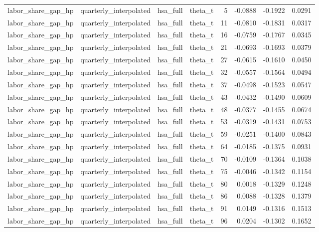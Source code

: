 \begin{tabular}{llllrrrr}
labor\_share\_gap\_hp & quarterly\_interpolated & hsa\_full & theta\_t & 5 & -0.0888 & -0.1922 & 0.0291 \\
labor\_share\_gap\_hp & quarterly\_interpolated & hsa\_full & theta\_t & 11 & -0.0810 & -0.1831 & 0.0317 \\
labor\_share\_gap\_hp & quarterly\_interpolated & hsa\_full & theta\_t & 16 & -0.0759 & -0.1767 & 0.0345 \\
labor\_share\_gap\_hp & quarterly\_interpolated & hsa\_full & theta\_t & 21 & -0.0693 & -0.1693 & 0.0379 \\
labor\_share\_gap\_hp & quarterly\_interpolated & hsa\_full & theta\_t & 27 & -0.0615 & -0.1610 & 0.0450 \\
labor\_share\_gap\_hp & quarterly\_interpolated & hsa\_full & theta\_t & 32 & -0.0557 & -0.1564 & 0.0494 \\
labor\_share\_gap\_hp & quarterly\_interpolated & hsa\_full & theta\_t & 37 & -0.0498 & -0.1523 & 0.0547 \\
labor\_share\_gap\_hp & quarterly\_interpolated & hsa\_full & theta\_t & 43 & -0.0432 & -0.1490 & 0.0609 \\
labor\_share\_gap\_hp & quarterly\_interpolated & hsa\_full & theta\_t & 48 & -0.0377 & -0.1455 & 0.0674 \\
labor\_share\_gap\_hp & quarterly\_interpolated & hsa\_full & theta\_t & 53 & -0.0319 & -0.1431 & 0.0753 \\
labor\_share\_gap\_hp & quarterly\_interpolated & hsa\_full & theta\_t & 59 & -0.0251 & -0.1400 & 0.0843 \\
labor\_share\_gap\_hp & quarterly\_interpolated & hsa\_full & theta\_t & 64 & -0.0185 & -0.1375 & 0.0931 \\
labor\_share\_gap\_hp & quarterly\_interpolated & hsa\_full & theta\_t & 70 & -0.0109 & -0.1364 & 0.1038 \\
labor\_share\_gap\_hp & quarterly\_interpolated & hsa\_full & theta\_t & 75 & -0.0046 & -0.1342 & 0.1154 \\
labor\_share\_gap\_hp & quarterly\_interpolated & hsa\_full & theta\_t & 80 & 0.0018 & -0.1329 & 0.1248 \\
labor\_share\_gap\_hp & quarterly\_interpolated & hsa\_full & theta\_t & 86 & 0.0088 & -0.1328 & 0.1379 \\
labor\_share\_gap\_hp & quarterly\_interpolated & hsa\_full & theta\_t & 91 & 0.0149 & -0.1316 & 0.1513 \\
labor\_share\_gap\_hp & quarterly\_interpolated & hsa\_full & theta\_t & 96 & 0.0204 & -0.1302 & 0.1652 \\

\end{tabular}
